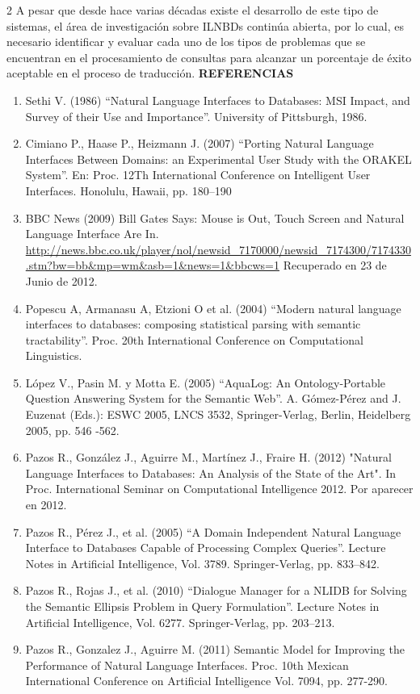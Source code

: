 \documentclass[letterpaper,10pt,final,hyphenatedtitles]{papertexKS}
\renewcommand{\innerTextFinalMark}{\ding{85}}
\begin{document}
\begin{news}{2}
A pesar que desde hace varias décadas existe el desarrollo de este tipo de sistemas, el área de investigación sobre ILNBDs continúa abierta, por lo cual, es necesario identificar y evaluar cada uno de los tipos de problemas que se encuentran en el procesamiento de consultas para alcanzar un porcentaje de éxito aceptable en el proceso de traducción.\innerTextFinalMark
\newssep
\noindent\textcolor{color}{\textbf{REFERENCIAS}}
\scriptsize{
\begin{enumerate}
\item Sethi V. (1986) “Natural Language Interfaces to Databases: MSI Impact, and Survey of their Use and Importance”. University of Pittsburgh, 1986.

\item Cimiano P., Haase P., Heizmann J. (2007) “Porting Natural Language Interfaces Between Domains: an Experimental User Study with the ORAKEL System”. En: Proc. 12Th International Conference on Intelligent User Interfaces. Honolulu, Hawaii, pp. 180–190

\item BBC News (2009) Bill Gates Says: Mouse is Out, Touch Screen and Natural Language Interface Are In.
\url{http://news.bbc.co.uk/player/nol/newsid\_7170000/newsid\_7174300/7174330.stm?bw=bb\&mp=wm\&asb=1\&news=1\&bbcws=1}
		Recuperado en 23 de Junio de 2012.
		
\item Popescu A, Armanasu A, Etzioni O et al. (2004) “Modern natural language interfaces to databases: composing statistical parsing with semantic tractability”. Proc. 20th International Conference on Computational Linguistics.

\item López V., Pasin M. y Motta E. (2005) “AquaLog: An Ontology-Portable Question Answering System for the Semantic Web”. A. Gómez-Pérez and J. Euzenat (Eds.): ESWC 2005, LNCS 3532, Springer-Verlag, Berlin, Heidelberg 2005, pp. 546 -562. 

\item Pazos R., González J., Aguirre M., Martínez J., Fraire H. (2012) "Natural Language Interfaces to Databases: An Analysis of the State of the Art". In Proc. International Seminar on Computational Intelligence 2012. Por aparecer en 2012.

\item Pazos R., Pérez J., et al. (2005) “A Domain Independent Natural Language Interface to Databases Capable of Processing Complex Queries”. Lecture Notes in Artificial Intelligence, Vol. 3789. Springer-Verlag, pp. 833–842.

\item Pazos R., Rojas J., et al. (2010) “Dialogue Manager for a NLIDB for Solving the Semantic Ellipsis Problem in Query Formulation”. Lecture Notes in Artificial Intelligence, Vol. 6277. Springer-Verlag, pp. 203–213.

\item Pazos R., Gonzalez J., Aguirre M. (2011) Semantic Model for Improving the Performance of Natural Language Interfaces. Proc. 10th Mexican International Conference on Artificial Intelligence Vol. 7094, pp. 277-290.
\end{enumerate}
}
\end{news}
\end{document}
